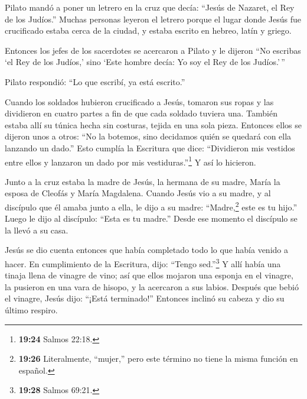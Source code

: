  Pilato mandó a poner un letrero en la cruz que decía:
``Jesús de Nazaret, el Rey de los Judíos.''  Muchas
personas leyeron el letrero porque el lugar donde Jesús fue crucificado
estaba cerca de la ciudad, y estaba escrito en hebreo, latín y griego.

 Entonces los jefes de los sacerdotes se acercaron a Pilato
y le dijeron ``No escribas `el Rey de los Judíos,' sino `Este hombre
decía: Yo soy el Rey de los Judíos.'\,''

 Pilato respondió: ``Lo que escribí, ya está escrito.''

 Cuando los soldados hubieron crucificado a Jesús, tomaron
sus ropas y las dividieron en cuatro partes a fin de que cada soldado
tuviera una. También estaba allí su túnica hecha sin costuras, tejida en
una sola pieza.  Entonces ellos se dijeron unos a otros:
``No la botemos, sino decidamos quién se quedará con ella lanzando un
dado.'' Esto cumplía la Escritura que dice: ``Dividieron mis vestidos
entre ellos y lanzaron un dado por mis vestiduras.''\footnote{\textbf{19:24}
  Salmos 22:18.}  Y así lo hicieron.

Junto a la cruz estaba la madre de Jesús, la hermana de su madre, María
la esposa de Cleofás y María Magdalena.  Cuando Jesús vio a
su madre, y al discípulo que él amaba junto a ella, le dijo a su madre:
``Madre,\footnote{\textbf{19:26} Literalmente, ``mujer,'' pero este
  término no tiene la misma función en español.} este es tu hijo.''
 Luego le dijo al discípulo: ``Esta es tu madre.'' Desde
ese momento el discípulo se la llevó a su casa.

 Jesús se dio cuenta entonces que había completado todo lo
que había venido a hacer. En cumplimiento de la Escritura, dijo: ``Tengo
sed.''\footnote{\textbf{19:28} Salmos 69:21.}  Y allí había
una tinaja llena de vinagre de vino; así que ellos mojaron una esponja
en el vinagre, la pusieron en una vara de hisopo, y la acercaron a sus
labios.  Después que bebió el vinagre, Jesús dijo: ``¡Está
terminado!'' Entonces inclinó su cabeza y dio su último respiro.


